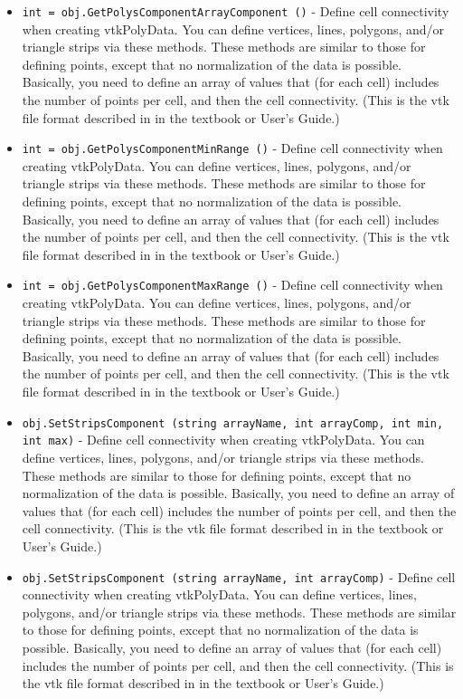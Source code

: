 \begin{itemize}
\item  \verb|int = obj.GetPolysComponentArrayComponent ()| -  Define cell connectivity when creating vtkPolyData. You can define
 vertices, lines, polygons, and/or triangle strips via these methods.
 These methods are similar to those for defining points, except
 that no normalization of the data is possible. Basically, you need to
 define an array of values that (for each cell) includes the number of 
 points per cell, and then the cell connectivity. (This is the vtk file 
 format described in in the textbook or User's Guide.)

\item  \verb|int = obj.GetPolysComponentMinRange ()| -  Define cell connectivity when creating vtkPolyData. You can define
 vertices, lines, polygons, and/or triangle strips via these methods.
 These methods are similar to those for defining points, except
 that no normalization of the data is possible. Basically, you need to
 define an array of values that (for each cell) includes the number of 
 points per cell, and then the cell connectivity. (This is the vtk file 
 format described in in the textbook or User's Guide.)

\item  \verb|int = obj.GetPolysComponentMaxRange ()| -  Define cell connectivity when creating vtkPolyData. You can define
 vertices, lines, polygons, and/or triangle strips via these methods.
 These methods are similar to those for defining points, except
 that no normalization of the data is possible. Basically, you need to
 define an array of values that (for each cell) includes the number of 
 points per cell, and then the cell connectivity. (This is the vtk file 
 format described in in the textbook or User's Guide.)

\item  \verb|obj.SetStripsComponent (string arrayName, int arrayComp, int min, int max)| -  Define cell connectivity when creating vtkPolyData. You can define
 vertices, lines, polygons, and/or triangle strips via these methods.
 These methods are similar to those for defining points, except
 that no normalization of the data is possible. Basically, you need to
 define an array of values that (for each cell) includes the number of 
 points per cell, and then the cell connectivity. (This is the vtk file 
 format described in in the textbook or User's Guide.)

\item  \verb|obj.SetStripsComponent (string arrayName, int arrayComp)| -  Define cell connectivity when creating vtkPolyData. You can define
 vertices, lines, polygons, and/or triangle strips via these methods.
 These methods are similar to those for defining points, except
 that no normalization of the data is possible. Basically, you need to
 define an array of values that (for each cell) includes the number of 
 points per cell, and then the cell connectivity. (This is the vtk file 
 format described in in the textbook or User's Guide.)


\end{itemize}
